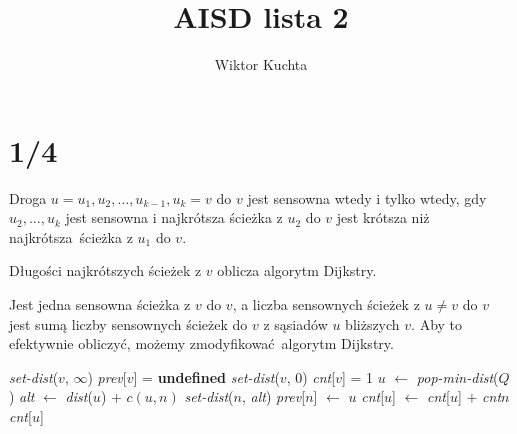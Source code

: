 \documentclass[a4paper, 12pt]{article}
\title{AISD lista 2}
\author{Wiktor Kuchta}
\date{\vspace{-4ex}}
\newcommand{\+}{\enspace}
\begin{document}
\maketitle

\section*{1/4}
Droga $u=u_1, u_2, …, u_{k-1}, u_k=v$ do $v$
jest sensowna wtedy i tylko wtedy,
gdy $u_2, …, u_k$ jest sensowna i najkrótsza
ścieżka z $u_2$ do $v$ jest krótsza niż najkrótsza ścieżka z $u_1$ do $v$.

Długości najkrótszych ścieżek z $v$ oblicza algorytm Dijkstry.

Jest jedna sensowna ścieżka z $v$ do $v$, a
liczba sensownych ścieżek z $u≠v$ do $v$ jest sumą liczby sensownych ścieżek do $v$
z sąsiadów $u$ bliższych $v$.
Aby to efektywnie obliczyć, możemy zmodyfikować algorytm Dijkstry.

\begin{algorithm}
	\begin{algorithmic}
				\State \textit{set-dist}($v$, $∞$)
				\State \textit{prev}[$v$] = \textbf{undefined}
				\State {}
			\EndFor
			\State \textit{set-dist}($v$, $0$)
			\State \textit{cnt}[$v$] = 1
				\State $u$ $←$ \textit{pop-min-dist}($Q$)
					\State \textit{alt} $←$ \textit{dist}($u$) + $c(u,n)$
						\State \textit{set-dist}($n$, \textit{alt})
						\State \textit{prev}[$n$] $←$ $u$
						\State \textit{cnt}[$u$] $←$ \textit{cnt}[$u$] $+$ \textit{cnt}{$n$}
					\EndIf
				\EndFor
			\EndWhile
			\State \Return \textit{cnt}[$u$]
		\EndProcedure
	\end{algorithmic}
\end{algorithm}

\newpage
\end{document}
